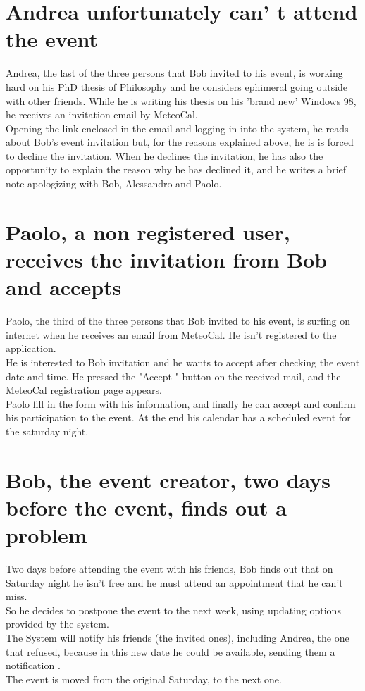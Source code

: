 \documentclass[12pt]{book}
\begin{document}
\section{Andrea unfortunately can' t attend the event}
Andrea, the last of the three persons that Bob invited to his event, is working hard on his PhD thesis of Philosophy and he considers ephimeral going outside with other friends. While he is writing his thesis on his 'brand new' Windows 98, he receives an invitation email by MeteoCal. \\
Opening the link enclosed in the email and logging in into the system, he reads about Bob's event invitation but, for the reasons explained above, he is is forced to decline the invitation. When he declines the invitation, he has also the opportunity to explain the reason why he has declined it, and he writes a brief note apologizing with Bob, Alessandro and Paolo. 

\section{Paolo, a non registered user, receives the invitation from Bob and accepts}
Paolo, the third of the three persons that Bob invited to his event, is surfing on internet when he receives an email from MeteoCal. He isn't registered to the application. \\ He is interested to Bob invitation and he wants to accept after checking the event date and time. He pressed the "Accept " button on the received mail, and the MeteoCal registration page appears.\\ Paolo fill in the form with his information, and finally he can accept and confirm his participation to the event. At the end his calendar has a scheduled event for the saturday night.\\ 

\section{Bob, the event creator, two days before the event, finds out a problem}
Two days before attending the event with his friends, Bob finds out that on Saturday night he isn't free and he must attend an appointment that he can't miss. \\
So he decides to postpone the event to the next week, using updating options provided by the system. \\
The System will notify his friends (the invited ones), including Andrea, the one that refused, because in this new date he could be available, sending them a notification .\\ The event is moved from the original Saturday, to the next one. \\
\end{document}
